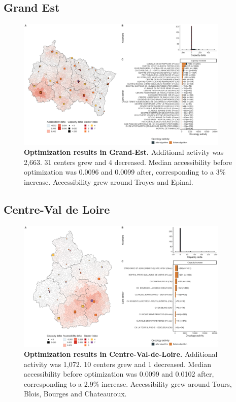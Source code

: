 \subsection*{Grand Est}

\begin{figure}[H]
    \includegraphics[width=0.9\textwidth]{images/camion/optim_region/optim_Grand-Est.png}
    \centering
    \caption{ \textbf{Optimization results in Grand-Est.} Additional activity
        was 2,663. 31 centers grew and 4 decreased. Median accessibility before
        optimization was 0.0096 and 0.0099 after, corresponding to a 3\%
        increase. Accessibility grew around Troyes and Epinal. }
\end{figure}

\subsection*{Centre-Val de Loire}

\begin{figure}[H]
    \includegraphics[width=0.9\textwidth]{images/camion/optim_region/optim_Centre-Val-de-Loire.png}
    \centering
    \caption{ \textbf{Optimization results in Centre-Val-de-Loire.} Additional
        activity was 1,072. 10 centers grew and 1 decreased. Median
        accessibility before optimization was 0.0099 and 0.0102 after,
        corresponding to a 2.9\% increase. Accessibility grew around Tours,
        Blois, Bourges and Chateauroux. }
\end{figure}

